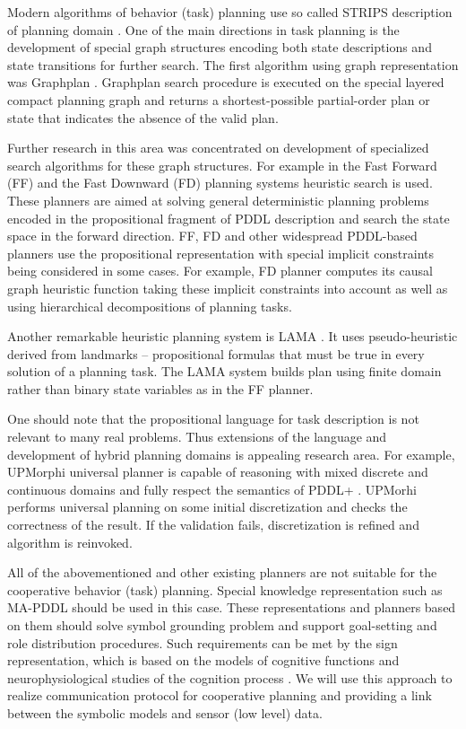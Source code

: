 \documentclass[runningheads,a4paper]{llncs}
\begin{document}
Modern algorithms of behavior (task) planning use so called STRIPS description of planning domain \cite{Fikes1971}. One of the main directions in task planning is the development of special graph structures encoding both state descriptions and state transitions for further search. The first algorithm using graph representation was Graphplan \cite{Blum1997}. Graphplan search procedure is executed on the special layered compact planning graph and returns a shortest-possible partial-order plan or state that indicates the absence of the valid plan.

Further research in this area was concentrated on development of specialized search algorithms for these graph structures. For example in the Fast Forward (FF) \cite{Hoffmann2001} and the Fast Downward (FD) planning systems \cite{Helmert2006} heuristic search is used. These planners are aimed at solving general deterministic planning problems encoded in the propositional fragment of PDDL description \cite{Fox2003} and search the state space in the forward direction. FF, FD and other widespread PDDL-based planners use the propositional representation with special implicit constraints being considered in some cases. For example, FD planner computes its causal graph  heuristic function taking these implicit constraints into account as well as using hierarchical decompositions of planning tasks.

Another remarkable heuristic planning system is LAMA \cite{Richter2010}. It uses pseudo-heuristic derived from landmarks – propositional formulas that must be true in every solution of a planning task. The LAMA system builds plan using finite domain rather than binary state variables as in the FF planner.

One should note that the propositional language for task description is not relevant to many real problems. Thus extensions of the language and development of hybrid planning domains is appealing research area. For example, UPMorphi universal planner \cite{Della2012} is capable of reasoning with mixed discrete and continuous domains and fully respect  the semantics of PDDL+ \cite{Fox2006}. UPMorhi performs universal planning on some initial discretization and checks the correctness of the result. If the validation fails, discretization is refined and algorithm is reinvoked. 

All of the abovementioned and other existing planners are not suitable for the cooperative behavior (task) planning. Special knowledge representation such as MA-PDDL \cite{Kovacs2012} should be used in this case. These representations and planners based on them should solve symbol grounding problem \cite{Harnad1990} and support goal-setting and role distribution procedures. Such requirements can be met by the sign representation, which is based on the models of cognitive functions \cite{Osipov2014} and neurophysiological studies of the cognition process \cite{Edelman1987,Ivanitsky1997}. We will use this approach to realize communication protocol for cooperative planning and providing a link between the symbolic models and sensor (low level) data.
\end{document}
